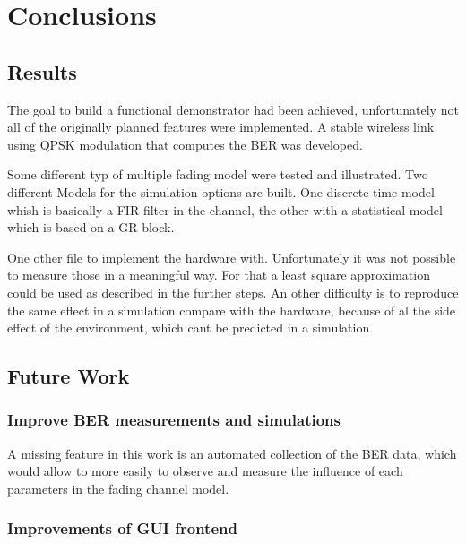 
\chapter{Conclusions} \label{chp:conclusions}

\section{Results}

The goal to build a functional demonstrator had been achieved, unfortunately not all of the originally planned features were implemented. A stable wireless link using QPSK modulation that computes the BER was developed.

Some different typ of multiple fading model were tested and illustrated.
Two different Models for the simulation options are built. One discrete time model whish is  basically a FIR filter in the channel, the other with a statistical model which is based on a GR block.

One other file to implement the hardware with. Unfortunately it was not possible to measure those in a meaningful way. For that a least square approximation could be used as described in the further steps. An other difficulty is to reproduce the same effect in a simulation compare with the hardware, because of al the side effect of the environment, which cant be predicted in a simulation.


\section{Future Work}


\subsection{Improve BER measurements and simulations}

A missing feature in this work is an automated collection of the BER data, which would allow to more easily to observe and measure the influence of each parameters in the fading channel model.

\subsection{Improvements of GUI frontend}

